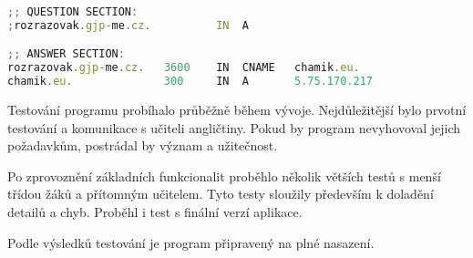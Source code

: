 \begin{lstlisting}[language=JavaScript,caption={Úryvek výpisu programu dig}]
;; QUESTION SECTION:
;rozrazovak.gjp-me.cz.		    IN	A

;; ANSWER SECTION:
rozrazovak.gjp-me.cz.	3600    IN	CNAME	chamik.eu.
chamik.eu.		        300	    IN	A	    5.75.170.217
\end{lstlisting}

Testování programu probíhalo průběžně během vývoje. Nejdůležitější bylo prvotní testování a komunikace s učiteli angličtiny. Pokud by program nevyhovoval jejich požadavkům, postrádal by význam a užitečnost.

Po zprovoznění základních funkcionalit proběhlo několik větších testů s menší třídou žáků a přítomným učitelem. Tyto testy sloužily především k doladění detailů a chyb. Proběhl i test s finální verzí aplikace.

Podle výsledků testování je program připravený na plné nasazení.